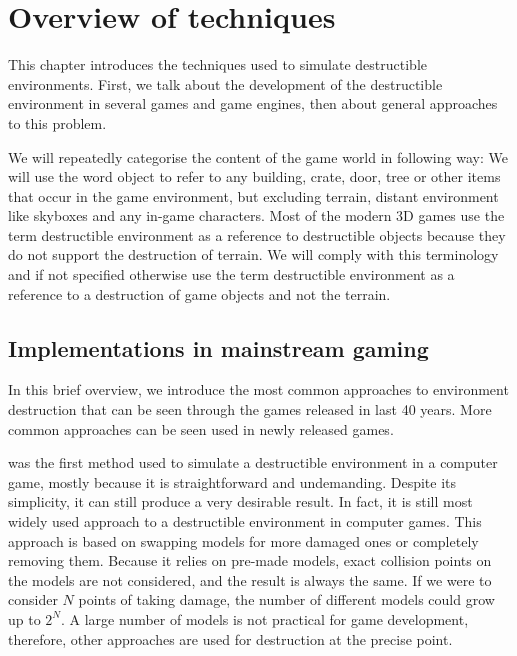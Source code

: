 \chapter{Overview of techniques}
This chapter introduces the techniques used to simulate destructible environments. First, we talk about the development of the destructible environment in several games and game engines, then about general approaches to this problem.

We will repeatedly categorise the content of the game world in following way: We will use the word object to refer to any building, crate, door, tree or other items that occur in the game environment, but excluding terrain, distant environment like skyboxes and any in-game characters. Most of the modern 3D games use the term destructible environment as a reference to destructible objects because they do not support the destruction of terrain. We will comply with this terminology and if not specified otherwise use the term destructible environment as a reference to a destruction of game objects and not the terrain.

\section{Implementations in mainstream gaming}
\label{sec:common}
In this brief overview, we introduce the most common approaches to environment destruction that can be seen through the games released in last 40 years. More common approaches can be seen used in newly released games.

 was the first method used to simulate a destructible environment in a computer game, mostly because it is straightforward and undemanding. Despite its simplicity, it can still produce a very desirable result. In fact, it is still most widely used approach to a destructible environment in computer games. This approach is based on swapping models for more damaged ones or completely removing them. Because it relies on pre-made models, exact collision points on the models are not considered, and the result is always the same. If we were to consider $N$ points of taking damage, the number of different models could grow up to $2^N$. A large number of models is not practical for game development, therefore, other approaches are used for destruction at the precise point.

